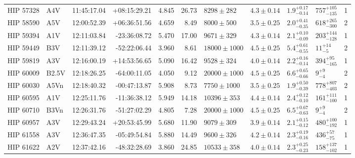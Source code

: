 \begin{landscape}
\begin{scriptsize}
\begin{longtable}{|l|lrrrrlllll|}
   HIP 57328 &      A4V &    11:45:17.04 &   +08:15:29.21 &   4.845 &     26.73 &    $8298 \pm 282$ &  $4.3 \pm 0.14$ &  $1.9^{+0.17}_{-0.14}$ &   $757^{+105}_{-135}$ &       1 \\
   HIP 58590 &      A5V &    12:00:52.39 &   +06:36:51.56 &   4.659 &      8.49 &    $8000 \pm 500$ &  $3.5 \pm 0.25$ &  $2.0^{+0.41}_{-0.35}$ &   $618^{+265}_{-300}$ &       2 \\
   HIP 59394 &      A1V &    12:11:03.84 &   -23:36:08.72 &   5.470 &     17.00 &    $9671 \pm 329$ &  $4.3 \pm 0.14$ &  $2.1^{+0.10}_{-0.09}$ &   $203^{+144}_{-128}$ &       1 \\
   HIP 59449 &      B3V &    12:11:39.12 &   -52:22:06.44 &   3.960 &      8.61 &  $18000 \pm 1000$ &  $4.5 \pm 0.25$ &  $5.4^{+0.61}_{-0.55}$ &       $11^{+14}_{-5}$ &       2 \\
   HIP 59819 &      A3V &    12:16:00.19 &   +14:53:56.65 &   5.090 &     16.42 &    $9528 \pm 324$ &  $4.0 \pm 0.14$ &  $2.2^{+0.16}_{-0.14}$ &    $394^{+95}_{-165}$ &       1 \\
   HIP 60009 &    B2.5V &    12:18:26.25 &   -64:00:11.05 &   4.050 &      9.12 &  $20000 \pm 1000$ &  $4.5 \pm 0.25$ &  $6.6^{+0.65}_{-0.66}$ &         $9^{+9}_{-4}$ &       2 \\
   HIP 60030 &     A5Vn &    12:18:40.32 &   -00:47:13.87 &   5.908 &      8.73 &   $7750 \pm 1000$ &  $3.5 \pm 0.25$ &  $1.9^{+0.50}_{-0.39}$ &   $778^{+807}_{-403}$ &       2 \\
   HIP 60595 &      A1V &    12:25:11.76 &   -11:36:38.12 &   5.949 &     14.18 &   $10396 \pm 353$ &  $4.4 \pm 0.14$ &  $2.4^{+0.12}_{-0.10}$ &   $161^{+111}_{-100}$ &       1 \\
   HIP 60710 &     B3Vn &    12:26:31.76 &   -51:27:02.29 &   4.805 &      7.28 &  $20000 \pm 1000$ &  $4.5 \pm 0.25$ &  $6.5^{+0.67}_{-0.63}$ &         $9^{+9}_{-4}$ &       2 \\
   HIP 60957 &      A3V &    12:29:43.24 &   +20:53:45.99 &   5.680 &     11.90 &    $9079 \pm 309$ &  $3.9 \pm 0.14$ &  $2.1^{+0.15}_{-0.12}$ &   $480^{+100}_{-192}$ &       1 \\
   HIP 61558 &      A3V &    12:36:47.35 &   -05:49:54.84 &   5.880 &     14.49 &    $9600 \pm 326$ &  $4.2 \pm 0.14$ &  $2.3^{+0.19}_{-0.16}$ &     $436^{+57}_{-75}$ &       1 \\
   HIP 61622 &      A2V &    12:37:42.16 &   -48:32:28.69 &   3.860 &     24.85 &   $10533 \pm 358$ &  $4.0 \pm 0.14$ &  $2.3^{+0.25}_{-0.23}$ &   $158^{+137}_{-102}$ &       1 \\

\end{longtable}
\end{scriptsize}
\end{landscape}
